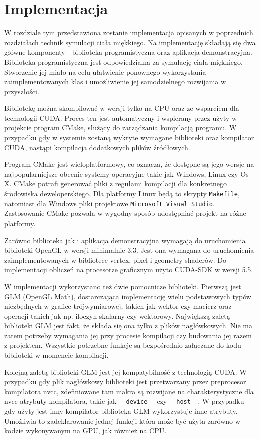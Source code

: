 \chapter{Implementacja}
W rozdziale tym przedstawiona zostanie implementacja opisanych w poprzednich
rozdziałach technik symulacji ciała miękkiego. Na implementację składają się dwa
główne komponenty - biblioteka programistyczna oraz aplikacja demonstracyjna.
Biblioteka programistyczna jest odpowiedzialna za symulację ciała miękkiego.
Stworzenie jej miało na celu ułatwienie ponownego
wykorzystania zaimplementowanych klas i umożliwienie jej samodzielnego
rozwijania w przyszłości.

Bibliotekę można skompilować w wersji tylko na CPU oraz ze wsparciem dla technologii
CUDA.  Proces ten jest automatyczny i wspierany przez użyty w projekcie program
CMake, służący do zarządzania kompilacją programu. W przypadku gdy w systemie
zostaną wykryte wymagane biblioteki oraz kompilator CUDA, nastąpi kompilacja
dodatkowych plików źródłowych.

Program CMake jest wieloplatformowy, co oznacza, że dostępne są jego wersje na
najpopularniejsze obecnie systemy operacyjne takie jak Windows, Linux czy Os X.
CMake potrafi generować pliki z regułami kompilacji dla konkretnego środowiska
deweloperskiego. Dla platformy Linux będą to skrypty \texttt{Makefile},
	natomiast dla Windows pliki projektowe \texttt{Microsoft Visual Studio}.
	Zastosowanie CMake pozwala w wygodny sposób udostępniać projekt na różne
	platformy.

Zarówno biblioteka jak i aplikacja demonstracyjna wymagają do uruchomienia
biblioteki OpenGL w wersji minimalnie 3.3. Jest ona wymagana do uruchomienia
zaimplementowanych w bibliotece vertex, pixel i geometry shaderów. Do implementacji obliczeń
na procesorze graficznym użyto CUDA-SDK w wersji 5.5.

W implementacji wykorzystano też dwie pomocnicze biblioteki.
Pierwszą jest GLM (OpenGL Math), dostarczająca implementację wielu podstawowych
typów niezbędnych w grafice trójwymiarowej, takich jak wektor czy macierz oraz
operacji takich jak np. iloczyn skalarny czy wektorowy. Największą zaletą
biblioteki GLM jest fakt, że składa się ona tylko z plików nagłówkowych. Nie ma
zatem potrzeby wymagania jej przy procesie kompilacji czy budowania jej razem z
projektem. Wszystkie potrzebne funkcje są bezpośrednio załączane do kodu
biblioteki w momencie kompilacji.

Kolejną zaletą biblioteki GLM jest jej kompatybilność z technologią CUDA. W przypadku
gdy plik nagłówkowy biblioteki jest przetwarzany przez preprocesor kompilatora
nvcc, zdefiniowane tam makra są rozwijane na charakterystyczne dla nvcc
atrybuty kompilatora, takie jak \texttt{\_\_device\_\_} czy \texttt{\_\_host\_\_}.
W przypadku gdy użyty jest inny kompilator biblioteka GLM wykorzystuje inne
atrybuty. Umożliwia to zadeklarowanie jednej funkcji która może być użyta zarówno
w kodzie wykonywanym na GPU, jak również na CPU.

